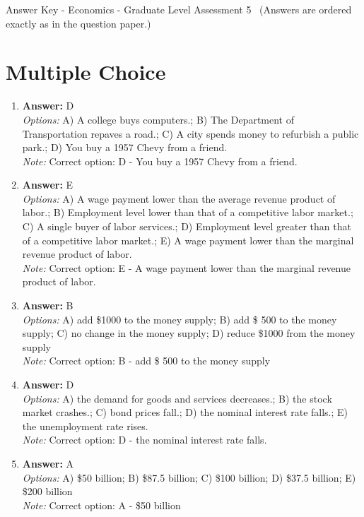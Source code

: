 \documentclass[12pt]{article}
\begin{document}
\begin{center}
Answer Key - Economics - Graduate Level Assessment 5 \
\small (Answers are ordered exactly as in the question paper.)
\end{center}

\section*{Multiple Choice}
\begin{enumerate}[label=\arabic*.]
\item \textbf{Answer:} D
\\ \textit{Options:} A) A college buys computers.; B) The Department of Transportation repaves a road.; C) A city spends money to refurbish a public park.; D) You buy a 1957 Chevy from a friend.
\\ \textit{Note:} Correct option: D - You buy a 1957 Chevy from a friend.
\item \textbf{Answer:} E
\\ \textit{Options:} A) A wage payment lower than the average revenue product of labor.; B) Employment level lower than that of a competitive labor market.; C) A single buyer of labor services.; D) Employment level greater than that of a competitive labor market.; E) A wage payment lower than the marginal revenue product of labor.
\\ \textit{Note:} Correct option: E - A wage payment lower than the marginal revenue product of labor.
\item \textbf{Answer:} B
\\ \textit{Options:} A) add \$1000 to the money supply; B) add \$ 500 to the money supply; C) no change in the money supply; D) reduce \$1000 from the money supply
\\ \textit{Note:} Correct option: B - add \$ 500 to the money supply
\item \textbf{Answer:} D
\\ \textit{Options:} A) the demand for goods and services decreases.; B) the stock market crashes.; C) bond prices fall.; D) the nominal interest rate falls.; E) the unemployment rate rises.
\\ \textit{Note:} Correct option: D - the nominal interest rate falls.
\item \textbf{Answer:} A
\\ \textit{Options:} A) \$50 billion; B) \$87.5 billion; C) \$100 billion; D) \$37.5 billion; E) \$200 billion
\\ \textit{Note:} Correct option: A - \$50 billion
\end{enumerate}
\end{document}
